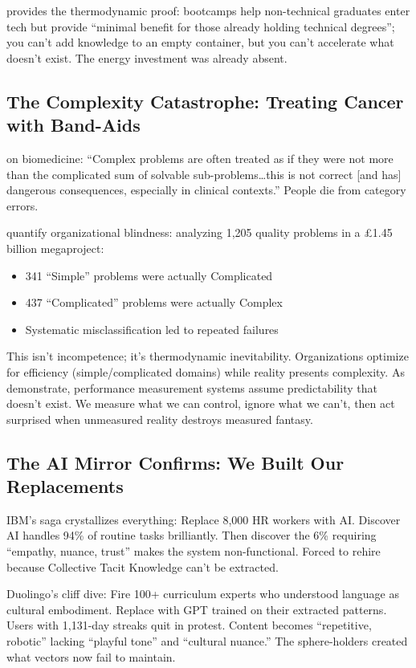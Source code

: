 \citet{joshi2019} provides the thermodynamic proof: bootcamps help non-technical graduates enter tech but provide ``minimal benefit for those already holding technical degrees''; you can't add knowledge to an empty container, but you can't accelerate what doesn't exist. The energy investment was already absent.

\subsection{The Complexity Catastrophe: Treating Cancer with Band-Aids}

\citet{kempermann2017} on biomedicine: ``Complex problems are often treated as if they were not more than the complicated sum of solvable sub-problems\ldots this is not correct [and has] dangerous consequences, especially in clinical contexts.'' People die from category errors.

\citet{ford2024} quantify organizational blindness: analyzing 1,205 quality problems in a £1.45 billion megaproject:
\begin{itemize}
\item 341 ``Simple'' problems were actually Complicated
\item 437 ``Complicated'' problems were actually Complex
\item Systematic misclassification led to repeated failures
\end{itemize}

This isn't incompetence; it's thermodynamic inevitability. Organizations optimize for efficiency (simple/complicated domains) while reality presents complexity. As \citet{alexander2018} demonstrate, performance measurement systems assume predictability that doesn't exist. We measure what we can control, ignore what we can't, then act surprised when unmeasured reality destroys measured fantasy.

\subsection{The AI Mirror Confirms: We Built Our Replacements}

IBM's saga crystallizes everything: Replace 8,000 HR workers with AI. Discover AI handles 94\% of routine tasks brilliantly. Then discover the 6\% requiring ``empathy, nuance, trust'' makes the system non-functional. Forced to rehire because \citet{collins2010} Collective Tacit Knowledge can't be extracted.

Duolingo's cliff dive: Fire 100+ curriculum experts who understood language as cultural embodiment. Replace with GPT trained on their extracted patterns. Users with 1,131-day streaks quit in protest. Content becomes ``repetitive, robotic'' lacking ``playful tone'' and ``cultural nuance.'' The sphere-holders created what vectors now fail to maintain.

